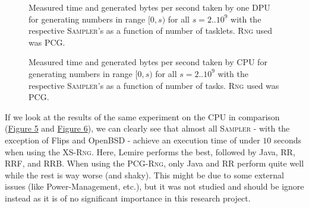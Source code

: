 \documentclass[a4paper]{scrartcl}
\begin{document}
\begin{figure}[!htb] \label{fig:5}
    \caption{
        Measured time and generated bytes per second taken by one DPU for generating numbers in range $[0,s)$ for all $s = 2..10^9$ with the respective \textsc{Sampler}'s as a function of number of tasklets. \textsc{Rng} used was PCG.      
    }   
\end{figure}


\begin{figure}[!htb] \label{fig:6}
    \caption{
        Measured time and generated bytes per second taken by CPU for generating numbers in range $[0,s)$ for all $s = 2..10^9$ with the respective \textsc{Sampler}'s as a function of number of tasks. \textsc{Rng} used was PCG.    
    }   
\end{figure}

\clearpage
If we look at the results of the same experiment on the CPU in comparison (\hyperref[fig:5]{Figure 5} and \hyperref[fig:6]{Figure 6}), we can clearly see that almost all \textsc{Sampler} - with the exception of Flips and OpenBSD - achieve an execution time of under $10$ seconds when using the XS-\textsc{Rng}.
Here, Lemire performs the best, followed by Java, RR, RRF, and RRB.
When using the PCG-\textsc{Rng}, only Java and RR perform quite well while the rest is way worse (and shaky). 
This might be due to some external issues (like Power-Management, etc.), but it was not studied and should be ignore instead as it is of no significant importance in this research project.
\end{document}
